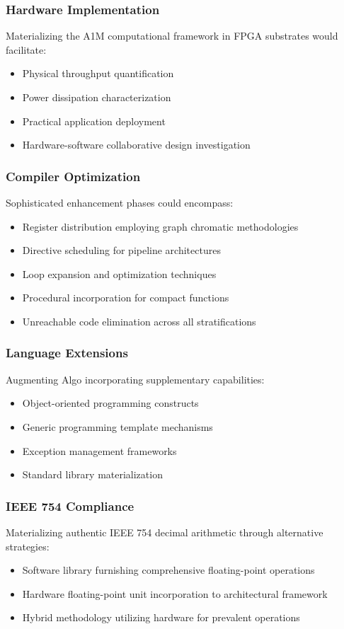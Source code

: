 \documentclass[conference,10pt,twocolumn]{IEEEtran}
\begin{document}
\subsubsection{Hardware Implementation}
Materializing the A1M computational framework in FPGA substrates would facilitate:
\begin{itemize}
\item Physical throughput quantification
\item Power dissipation characterization
\item Practical application deployment
\item Hardware-software collaborative design investigation
\end{itemize}

\subsubsection{Compiler Optimization}
Sophisticated enhancement phases could encompass:
\begin{itemize}
\item Register distribution employing graph chromatic methodologies
\item Directive scheduling for pipeline architectures
\item Loop expansion and optimization techniques
\item Procedural incorporation for compact functions
\item Unreachable code elimination across all stratifications
\end{itemize}

\subsubsection{Language Extensions}
Augmenting Algo incorporating supplementary capabilities:
\begin{itemize}
\item Object-oriented programming constructs
\item Generic programming template mechanisms
\item Exception management frameworks
\item Standard library materialization
\end{itemize}

\subsubsection{IEEE 754 Compliance}
Materializing authentic IEEE 754 decimal arithmetic through alternative strategies:
\begin{itemize}
\item Software library furnishing comprehensive floating-point operations
\item Hardware floating-point unit incorporation to architectural framework
\item Hybrid methodology utilizing hardware for prevalent operations
\end{itemize}
\end{document}
